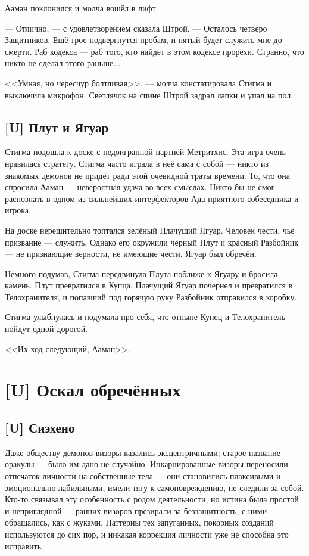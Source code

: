 Ааман поклонился и молча вошёл в лифт.

--- Отлично, --- с удовлетворением сказала Штрой.
--- Осталось четверо Защитников.
Ещё трое подвергнутся пробам, и пятый будет служить мне до смерти.
Раб кодекса --- раб того, кто найдёт в этом кодексе прорехи.
Странно, что никто не сделал этого раньше...

<<Умная, но чересчур болтливая>>, --- молча констатировала Стигма и выключила микрофон.
Светлячок на спине Штрой задрал лапки и упал на пол.

\section{[U] Плут и Ягуар}

Стигма подошла к доске с недоигранной партией Метритхис.
Эта игра очень нравилась стратегу.
Стигма часто играла в неё сама с собой --- никто из знакомых демонов не придёт ради этой очевидной траты времени.
То, что она спросила Ааман --- невероятная удача во всех смыслах.
Никто бы не смог распознать в одном из сильнейших интерфекторов Ада приятного собеседника и игрока.

На доске нерешительно топтался зелёный Плачущий Ягуар.
Человек чести, чьё призвание --- служить.
Однако его окружили чёрный Плут и красный Разбойник --- не признающие верности, не имеющие чести.
Ягуар был обречён.

Немного подумав, Стигма передвинула Плута поближе к Ягуару и бросила камень.
Плут превратился в Купца, Плачущий Ягуар почернел и превратился в Телохранителя, и попавший под горячую руку Разбойник отправился в коробку.

Стигма улыбнулась и подумала про себя, что отныне Купец и Телохранитель пойдут одной дорогой.

<<Их ход следующий, Ааман>>.

\chapter{[U] Оскал обречённых}

\section{[U] Сиэхено}

\textspace

Даже обществу демонов визоры казались эксцентричными;
старое название --- оракулы --- было им дано не случайно.
Инкарнированные визоры переносили отпечаток личности на собственные тела --- они становились плаксивыми и эмоционально лабильными, имели тягу к самоповреждению, не следили за собой.
Кто-то связывал эту особенность с родом деятельности, но истина была простой и неприглядной --- ранних визоров презирали за беззащитность, с ними обращались, как с жуками.
Паттерны тех запуганных, покорных созданий используются до сих пор, и никакая коррекция личности уже не способна это исправить.

